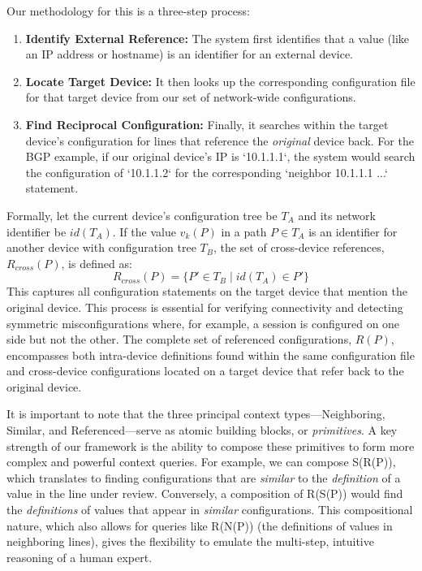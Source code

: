 Our methodology for this is a three-step process:
\begin{enumerate}
    \item \textbf{Identify External Reference:} The system first identifies that a value (like an IP address or hostname) is an identifier for an external device.
    \item \textbf{Locate Target Device:} It then looks up the corresponding configuration file for that target device from our set of network-wide configurations.
    \item \textbf{Find Reciprocal Configuration:} Finally, it searches within the target device's configuration for lines that reference the \textit{original} device back. For the BGP example, if our original device's IP is `10.1.1.1`, the system would search the configuration of `10.1.1.2` for the corresponding `neighbor 10.1.1.1 ...` statement.
\end{enumerate}

Formally, let the current device's configuration tree be $T_A$ and its network identifier be $id(T_A)$. If the value $v_k(P)$ in a path $P \in T_A$ is an identifier for another device with configuration tree $T_B$, the set of cross-device references, $R_{cross}(P)$, is defined as:
\[
R_{cross}(P) = \{ P' \in T_B \mid id(T_A) \in P' \}
\]
This captures all configuration statements on the target device that mention the original device. This process is essential for verifying connectivity and detecting symmetric misconfigurations where, for example, a session is configured on one side but not the other.
The complete set of referenced configurations, $R(P)$, encompasses both intra-device definitions found within the same configuration file and cross-device configurations located on a target device that refer back to the original device.

It is important to note that the three principal context types---Neighboring, Similar, and Referenced---serve as atomic building blocks, or \textit{primitives}. A key strength of our framework is the ability to compose these primitives to form more complex and powerful context queries. For example, we can compose S(R(P)), which translates to finding configurations that are \textit{similar} to the \textit{definition} of a value in the line under review. Conversely, a composition of R(S(P)) would find the \textit{definitions} of values that appear in \textit{similar} configurations. This compositional nature, which also allows for queries like R(N(P)) (the definitions of values in neighboring lines), gives \sysname{} the flexibility to emulate the multi-step, intuitive reasoning of a human expert.